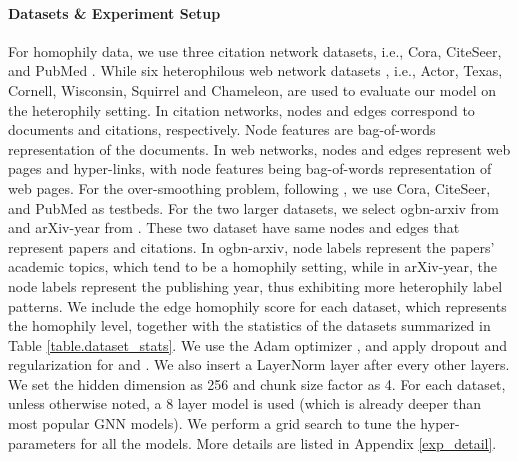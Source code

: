 \documentclass{article}
\begin{document}
\paragraph{Datasets \& Experiment Setup}
\label{exp_setup}
For homophily data, we use three citation network datasets, i.e., Cora, CiteSeer, and PubMed \citep{sen2008collective}. While six heterophilous web network datasets \citep{pei2020geom,musae}, i.e., Actor, Texas, Cornell, Wisconsin, Squirrel and Chameleon, are used to evaluate our model on the heterophily setting. In citation networks, nodes and edges correspond to documents and citations, respectively. Node features are bag-of-words representation of the documents. In web networks, nodes and edges represent web pages and hyper-links, with node features being bag-of-words representation of web pages. For the over-smoothing problem, following \citet{rong2019dropedge}, we use Cora, CiteSeer, and PubMed as testbeds. For the two larger datasets, we select ogbn-arxiv from \citet{hu2020open} and arXiv-year from \citet{lim2021new}. These two dataset have same nodes and edges that represent papers and citations. In ogbn-arxiv, node labels represent the papers' academic topics, which tend to be a homophily setting, while in arXiv-year, the node labels represent the publishing year, thus exhibiting more heterophily label patterns. We include the edge homophily score  \citep{yan2021two} for each dataset, which represents the homophily level, together with the statistics of the datasets summarized in Table \ref{table.dataset_stats}.
We use the Adam optimizer \citep{kingma2014adam}, and apply dropout and  regularization for  and . We also insert a LayerNorm \citep{ba2016layer} layer after every other layers. We set the hidden dimension as 256 and chunk size factor as 4. For each dataset, unless otherwise noted, a 8 layer model is used (which is already deeper than most popular GNN models).
We perform a grid search to tune the hyper-parameters for all the models.
More details are listed in Appendix \ref{exp_detail}.
\end{document}
